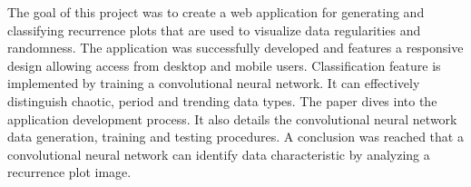 The goal of this project was to create a web application for generating and classifying recurrence plots that are used to visualize data regularities and randomness.
The application was successfully developed and features a responsive design allowing access from desktop and mobile users.
Classification feature is implemented by training a convolutional neural network.
It can effectively distinguish chaotic, period and trending data types.
The paper dives into the application development process.
It also details the convolutional neural network data generation, training and testing procedures.
A conclusion was reached that a convolutional neural network can identify data characteristic by analyzing a recurrence plot image.
